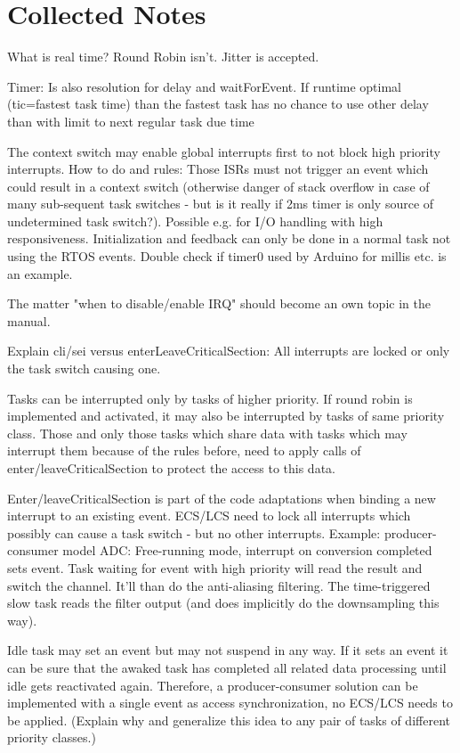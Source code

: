 \chapter{Collected Notes}

What is real time? Round Robin isn't. Jitter is accepted.

Timer: Is also resolution for delay and waitForEvent. If runtime optimal
(tic=fastest task time) than the fastest task has no chance to use other
delay than with limit to next regular task due time

The context switch may enable global interrupts first to not block high
priority interrupts. How to do and rules: Those ISRs must not trigger an
event which could result in a context switch (otherwise danger of stack
overflow in case of many sub-sequent task switches - but is it really if
2ms timer is only source of undetermined task switch?). Possible e.g. for
I/O handling with high responsiveness. Initialization and feedback can
only be done in a normal task not using the RTOS events.
  Double check if timer0 used by Arduino for millis etc. is an example.

The matter "when to disable/enable IRQ" should become an own topic in the
manual.

Explain cli/sei versus enterLeaveCriticalSection: All interrupts are
locked or only the task switch causing one.

Tasks can be interrupted only by tasks of higher priority. If round robin
is implemented and activated, it may also be interrupted by tasks of same
priority class. Those and only those tasks which share data with tasks
which may interrupt them because of the rules before, need to apply calls
of enter/leaveCriticalSection to protect the access to this data.

Enter/leaveCriticalSection is part of the code adaptations when binding a
new interrupt to an existing event. ECS/LCS need to lock all interrupts
which possibly can cause a task switch - but no other interrupts.
  Example: producer-consumer model ADC: Free-running mode, interrupt on
conversion completed sets event. Task waiting for event with high priority
will read the result and switch the channel. It'll than do the
anti-aliasing filtering. The time-triggered slow task reads the filter
output (and does implicitly do the downsampling this way).

Idle task may set an event but may not suspend in any way. If it sets an
event it can be sure that the awaked task has completed all related data
processing until idle gets reactivated again. Therefore, a
producer-consumer solution can be implemented with a single event as
access synchronization, no ECS/LCS needs to be applied. (Explain why and
generalize this idea to any pair of tasks of different priority classes.)

